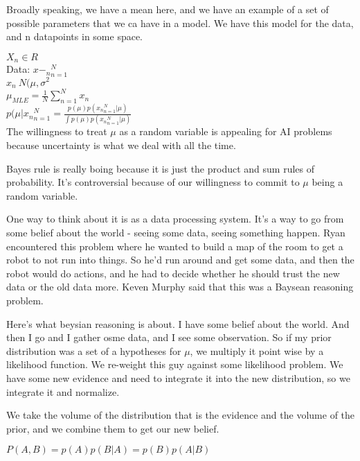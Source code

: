 \documentclass[12pt]{article}   	%
\begin{document}
Broadly speaking, we have a mean here, and we have an example of a set of possible parameters that we ca have in a model. We have this model for the data, and n datapoints in some space.

$X_{n} \in R$\\
Data: ${x-_{n}}^{N}_{n=1}$\\

$x_{n} ~ N({\mu, \sigma ^{2}}$\\
$\mu_{MLE} = \frac{1}{N} \sum\limits_{n=1}^{N}x_{n}$\\

$p(\mu | {x_{n}}^{N}_{n = 1} = \frac{p(\mu)p({x_{n}}^{N}_{n=1}|\mu)}{\int p(\mu)p({x_{n}}^{N}_{n=1}|\mu)}$\\




The willingness to treat $\mu$ as a random variable is appealing for AI problems because uncertainty is what we deal with all the time. 

Bayes rule is really boing because it is just the product and sum rules of probability. It's controversial because of our willingness to commit to $\mu$ being a random variable.

One way to think about it is as a data processing system. It's a way to go from some belief about the world - seeing some data, seeing something happen. Ryan encountered this problem where he wanted to build a map of the room to get a robot to not run into things. So he'd run around and get some data, and then the robot would do actions, and he had to decide whether he should trust the new data or the old data more. Keven Murphy said that this was a Baysean reasoning problem. 

Here's what beysian reasoning is about. I have some belief about the world. And then I go and I gather osme data, and I see some observation. So if my prior distribution was a set of a hypotheses for $\mu$, we multiply it point wise by a likelihood function. We re-weight this guy against some likelihood problem. We have some new evidence and need to integrate it into the new distribution, so we integrate it and normalize. 

We take the volume of the distribution that is the evidence and the volume of the prior, and we combine them to get our new belief. 

$P(A,B) = p(A)p(B|A) = p(B)p(A|B)$
\end{document}
